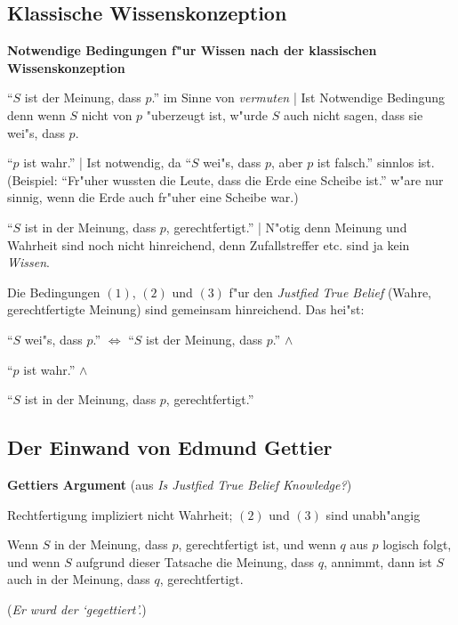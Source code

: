 \documentclass[emulatestandardclasses]{scrartcl}
\begin{document}
\subsection{Klassische Wissenskonzeption}

\textbf{Notwendige Bedingungen f"ur Wissen nach der klassischen Wissenskonzeption}

\begin{description}[leftmargin=!,labelwidth=\widthof{\bfseries $(1)$ Rechtfertigungi}]
  \item[$(1)$ Meinung] "`$S$ ist der Meinung, dass $p$."' im Sinne von \emph{vermuten} | Ist Notwendige Bedingung denn wenn $S$ nicht von $p$ "uberzeugt ist, w"urde $S$ auch nicht sagen, dass sie wei"s, dass $p$.
  \item[$(2)$ Wahrheit] "`$p$ ist wahr."' | Ist notwendig, da "`$S$ wei"s, dass $p$, aber $p$ ist falsch."' sinnlos ist. (Beispiel: "`Fr"uher wussten die Leute, dass die Erde eine Scheibe ist."' w"are nur sinnig, wenn die Erde auch fr"uher eine Scheibe war.)
  \item[$(3)$ Rechtfertigung] "`$S$ ist in der Meinung, dass $p$, gerechtfertigt."' | N"otig denn Meinung und Wahrheit sind noch nicht hinreichend, denn Zufallstreffer etc. sind ja kein \emph{Wissen}. 
\end{description}

Die Bedingungen $(1)$, $(2)$ und $(3)$ f"ur den \emph{Justfied True Belief} (Wahre, gerechtfertigte Meinung) sind gemeinsam hinreichend. Das hei"st:

"`$S$ wei"s, dass $p$."' \hspace{1mm} $\Leftrightarrow$ \hspace{2mm}"`$S$ ist der Meinung, dass $p$."' $\wedge$

\hspace{35mm} "`$p$ ist wahr."' $\wedge$

\hspace{36mm}"`$S$ ist in der Meinung, dass $p$, gerechtfertigt."'

\subsection{Der Einwand von Edmund Gettier}

\textbf{Gettiers Argument} (aus \emph{Is Justfied True Belief Knowledge?})

\begin{description}[leftmargin=!,labelwidth=\widthof{\bfseries Gegenbeispiel 2}]
  \item[Pr"amisse 1] Rechtfertigung impliziert nicht Wahrheit; $(2)$ und $(3)$ sind unabh"angig
  \item[Pr"amisse 2] Wenn $S$ in der Meinung, dass $p$, gerechtfertigt ist, und wenn $q$ aus $p$ logisch folgt, und wenn $S$ aufgrund dieser Tatsache die Meinung, dass $q$, annimmt, dann ist $S$ auch in der Meinung, dass $q$, gerechtfertigt.
  \item[Gegenbeispiel 1] (\emph{Er wurd der `gegettiert'.})
  \item[Gegenbeispiel 2] 
\end{description}
\end{document}
